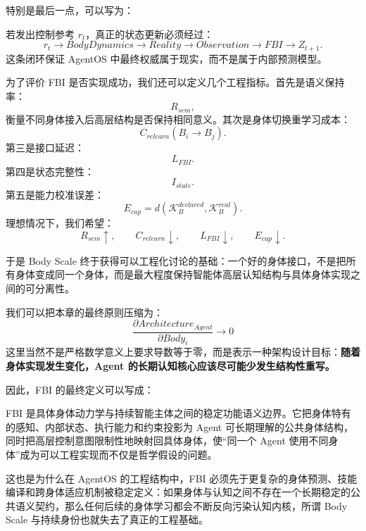 特别是最后一点，可以写为：
\begin{statementbox}
\centering
{}
\end{statementbox}
若发出控制参考 \(r_t\)，真正的状态更新必须经过：
\[
r_t
\rightarrow
BodyDynamics
\rightarrow
Reality
\rightarrow
Observation
\rightarrow
FBI
\rightarrow
Z_{t+1}.
\]
这条闭环保证 AgentOS 中最终权威属于现实，而不是属于内部预测模型。

为了评价 FBI 是否实现成功，我们还可以定义几个工程指标。首先是语义保持率：
\[
R_{sem},
\]
衡量不同身体接入后高层结构是否保持相同意义。其次是身体切换重学习成本：
\[
C_{relearn}(B_i\rightarrow B_j).
\]
第三是接口延迟：
\[
L_{FBI}.
\]
第四是状态完整性：
\[
I_{state}.
\]
第五是能力校准误差：
\[
E_{cap}
=
d(
\mathcal K_B^{declared},
\mathcal K_B^{real}
).
\]
理想情况下，我们希望：
\[
R_{sem}\uparrow,
\qquad
C_{relearn}\downarrow,
\qquad
L_{FBI}\downarrow,
\qquad
E_{cap}\downarrow.
\]

于是 Body Scale 终于获得可以工程化讨论的基础：一个好的身体接口，不是把所有身体变成同一个身体，而是最大程度保持智能体高层认知结构与具体身体实现之间的可分离性。

我们可以把本章的最终原则压缩为：
\[
\boxed{
\frac{\partial Architecture_{Agent}}
{\partial Body_i}
\rightarrow 0
}
\]
这里当然不是严格数学意义上要求导数等于零，而是表示一种架构设计目标：\textbf{随着身体实现发生变化，Agent 的长期认知核心应该尽可能少发生结构性重写。}

因此，FBI 的最终定义可以写成：

\begin{definition*}
FBI 是具体身体动力学与持续智能主体之间的稳定功能语义边界。它把身体特有的感知、内部状态、执行能力和约束投影为 Agent 可长期理解的公共身体结构，同时把高层控制意图限制性地映射回具体身体，使“同一个 Agent 使用不同身体”成为可以工程实现而不仅是哲学假设的问题。
\end{definition*}

这也是为什么在 AgentOS 的工程结构中，FBI 必须先于更复杂的身体预测、技能编译和跨身体适应机制被稳定定义：如果身体与认知之间不存在一个长期稳定的公共语义契约，那么任何后续的身体学习都会不断反向污染认知内核，所谓 Body Scale 与持续身份也就失去了真正的工程基础。

